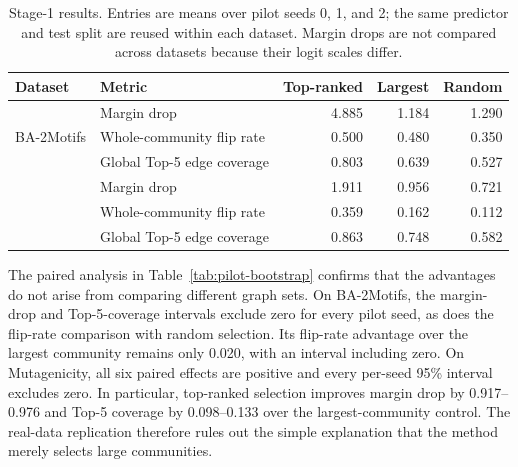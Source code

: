 \documentclass[runningheads]{llncs}
\begin{document}
\begin{table}[t]
\centering
\caption{Stage-1 results. Entries are means over pilot seeds 0, 1, and 2; the
same predictor and test split are reused within each dataset. Margin drops are
not compared across datasets because their logit scales differ.}
\label{tab:pilot-summary}
\small
\begin{tabular}{llrrr}
\toprule
Dataset & Metric & Top-ranked & Largest & Random \\
\midrule
\multirow{3}{*}{BA-2Motifs}
 & Margin drop & 4.885 & 1.184 & 1.290 \\
 & Whole-community flip rate & 0.500 & 0.480 & 0.350 \\
 & Global Top-5 edge coverage & 0.803 & 0.639 & 0.527 \\
\addlinespace
\multirow{3}{*}{Mutagenicity}
 & Margin drop & 1.911 & 0.956 & 0.721 \\
 & Whole-community flip rate & 0.359 & 0.162 & 0.112 \\
 & Global Top-5 edge coverage & 0.863 & 0.748 & 0.582 \\
\bottomrule
\end{tabular}
\end{table}

The paired analysis in Table~\ref{tab:pilot-bootstrap} confirms that the
advantages do not arise from comparing different graph sets. On BA-2Motifs,
the margin-drop and Top-5-coverage intervals exclude zero for every pilot seed,
as does the flip-rate comparison with random selection. Its flip-rate
advantage over the largest community remains only 0.020, with an interval
including zero. On Mutagenicity, all six paired effects are positive and every
per-seed 95\% interval excludes zero. In particular, top-ranked selection
improves margin drop by 0.917--0.976 and Top-5 coverage by 0.098--0.133 over
the largest-community control. The real-data replication therefore rules out
the simple explanation that the method merely selects large communities.
\end{document}
